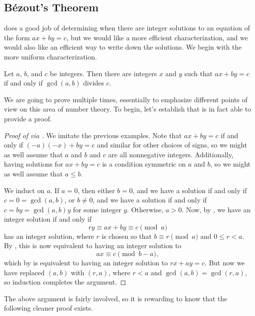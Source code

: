 \documentclass[../notes.tex]{subfiles}
\begin{document}
\subsection{B\'ezout's Theorem}
 does a good job of determining when there are integer solutions to an equation of the form $ax+by=c$, but we would like a more efficient characterization, and we would also like an efficient way to write down the solutions. We begin with the more uniform characterization.
\begin{theorem}[B\'ezout] \label{thm:bezout}
	Let $a$, $b$, and $c$ be integers. Then there are integers $x$ and $y$ such that $ax+by=c$ if and only if $\gcd(a,b)$ divides $c$.
\end{theorem}
We are going to prove  multiple times, essentially to emphasize different points of view on this area of number theory. To begin, let's establish that  is in fact able to provide a proof.
\begin{proof}[Proof of  via ]
	We imitate the previous examples. Note that $ax+by=c$ if and only if $(-a)(-x)+by=c$ and similar for other choices of signs, so we might as well assume that $a$ and $b$ and $c$ are all nonnegative integers. Additionally, having solutions for $ax+by=c$ is a condition symmetric on $a$ and $b$, so we might as well assume that $a\le b$.

	We induct on $a$. If $a=0$, then either $b=0$, and we have a solution if and only if $c=0=\gcd(a,b)$, or $b\ne0$, and we have a solution if and only if $c=by=\gcd(a,b)y$ for some integer $y$. Otherwise, $a>0$. Now, by , we have an integer solution if and only if
	\[ry\equiv ax+by\equiv c\pmod a\]
	has an integer solution, where $r$ is chosen so that $b\equiv r\pmod a$ and $0\le r<a$. By , this is now equivalent to having an integer solution to
	\[ax\equiv c\pmod{b-a},\]
	which by  is equivalent to having an integer solution to $rx+ay=c$. But now we have replaced $(a,b)$ with $(r,a)$, where $r<a$ and $\gcd(a,b)=\gcd(r,a)$, so induction completes the argument.
\end{proof}
The above argument is fairly involved, so it is rewarding to know that the following cleaner proof exists.
\end{document}
